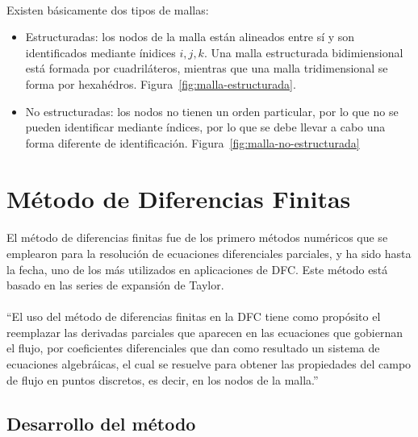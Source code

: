 \documentclass[letterpaper, openright, 12pt]{book}
\begin{document}
    \paragraph*{}
    Existen básicamente dos tipos de mallas:
    \begin{itemize}
    \item Estructuradas: los nodos de la malla están alineados entre sí y
      son identificados mediante ínidices $i, j, k$. Una malla estructurada
      bidimiensional está formada por cuadriláteros, mientras que una malla
      tridimensional se forma por hexahédros. Figura~\ref{fig:malla-estructurada}.
    \item No estructuradas: los nodos no tienen un orden particular, por lo
      que no se pueden identificar mediante índices, por lo que se debe llevar a
      cabo una forma diferente de identificación. Figura~\ref{fig:malla-no-estructurada}
    \end{itemize}



    \section{Método de Diferencias Finitas}
    \paragraph*{}
    El método de diferencias finitas fue de los primero métodos numéricos
    que se emplearon para la resolución de ecuaciones diferenciales
    parciales, y ha sido hasta la fecha, uno de los más utilizados en
    aplicaciones de DFC\@. Este método está basado en las series de expansión
    de Taylor.

    \paragraph*{}
    ``El uso del método de diferencias finitas en la DFC tiene como propósito el
    reemplazar las derivadas parciales que aparecen en las ecuaciones que
    gobiernan el flujo, por coeficientes diferenciales que dan como resultado un
    sistema de ecuaciones algebráicas, el cual se resuelve para obtener las
    propiedades del campo de flujo en puntos discretos, es decir, en los nodos
    de la malla.'' \cite{anderson-yotros}

    \subsection{Desarrollo del método}
\end{document}
